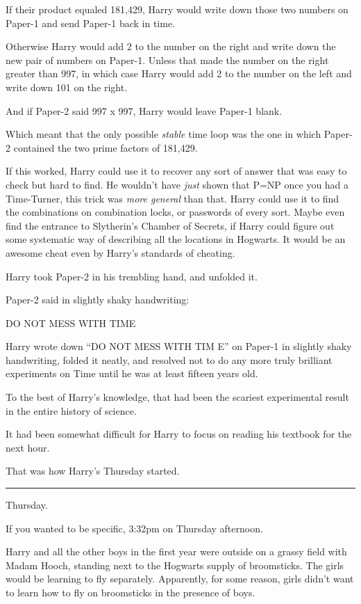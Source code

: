 If their product equaled 181,429, Harry would write down those two numbers on Paper-1 and send Paper-1 back in time.

Otherwise Harry would add 2 to the number on the right and write down the new pair of numbers on Paper-1. Unless that made the number on the right greater than 997, in which case Harry would add 2 to the number on the left and write down 101 on the right.

And if Paper-2 said 997 x 997, Harry would leave Paper-1 blank.

Which meant that the only possible \emph{stable} time loop was the one in which Paper-2 contained the two prime factors of 181,429.

If this worked, Harry could use it to recover any sort of answer that was easy to check but hard to find. He wouldn't have \emph{just} shown that P=NP once you had a Time-Turner, this trick was \emph{more general} than that. Harry could use it to find the combinations on combination locks, or passwords of every sort. Maybe even find the entrance to Slytherin's Chamber of Secrets, if Harry could figure out some systematic way of describing all the locations in Hogwarts. It would be an awesome cheat even by Harry's standards of cheating.

Harry took Paper-2 in his trembling hand, and unfolded it.

Paper-2 said in slightly shaky handwriting:

DO NOT MESS WITH TIME

Harry wrote down ``DO NOT MESS WITH TIM E'' on Paper-1 in slightly shaky handwriting, folded it neatly, and resolved not to do any more truly brilliant experiments on Time until he was at least fifteen years old.

To the best of Harry's knowledge, that had been the scariest experimental result in the entire history of science.

It had been somewhat difficult for Harry to focus on reading his textbook for the next hour.

That was how Harry's Thursday started.

\begin{center}\rule{3in}{0.4pt}\end{center}

Thursday.

If you wanted to be specific, 3:32pm on Thursday afternoon.

Harry and all the other boys in the first year were outside on a grassy field with Madam Hooch, standing next to the Hogwarts supply of broomsticks. The girls would be learning to fly separately. Apparently, for some reason, girls didn't want to learn how to fly on broomsticks in the presence of boys.

